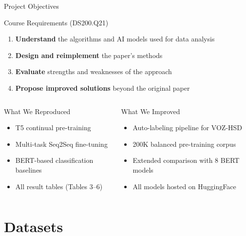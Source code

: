 \documentclass[10pt, aspectratio=169]{beamer}
\begin{document}
\begin{frame}[shrink=5]{Project Objectives}
  \begin{block}{Course Requirements (DS200.Q21)}
    \begin{enumerate}
      \item \textbf{Understand} the algorithms and AI models used for data analysis
      \item \textbf{Design and reimplement} the paper's methods
      \item \textbf{Evaluate} strengths and weaknesses of the approach
      \item \textbf{Propose improved solutions} beyond the original paper
    \end{enumerate}
  \end{block}
  \vspace{0.3cm}
  \begin{columns}[T]
    \begin{exampleblock}{What We Reproduced}
      \begin{itemize}
        \item T5 continual pre-training
        \item Multi-task Seq2Seq fine-tuning
        \item BERT-based classification baselines
        \item All result tables (Tables 3--6)
      \end{itemize}
    \end{exampleblock}

    \begin{alertblock}{What We Improved}
      \begin{itemize}
        \item Auto-labeling pipeline for VOZ-HSD
        \item 200K balanced pre-training corpus
        \item Extended comparison with 8 BERT models
        \item All models hosted on HuggingFace
      \end{itemize}
    \end{alertblock}
  \end{columns}
\end{frame}

\section{Datasets}
\end{document}
